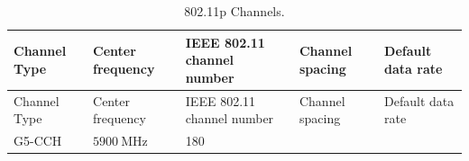 \documentclass[letterpaper,11pt]{article}
\begin{document}
\begin{onehalfspace}
\begin{longtable}[]{@{}lllll@{}}
\caption{802.11p Channels. \label{tbl:channels}}\tabularnewline
\toprule
\begin{minipage}[b]{0.08\columnwidth}\raggedright\strut
Channel Type\strut
\end{minipage} & \begin{minipage}[b]{0.30\columnwidth}\raggedright\strut
Center frequency\strut
\end{minipage} & \begin{minipage}[b]{0.16\columnwidth}\raggedright\strut
IEEE 802.11 channel number\strut
\end{minipage} & \begin{minipage}[b]{0.14\columnwidth}\raggedright\strut
Channel spacing\strut
\end{minipage} & \begin{minipage}[b]{0.18\columnwidth}\raggedright\strut
Default data rate\strut
\end{minipage}\tabularnewline
\midrule
\endfirsthead
\toprule
\begin{minipage}[b]{0.08\columnwidth}\raggedright\strut
Channel Type\strut
\end{minipage} & \begin{minipage}[b]{0.30\columnwidth}\raggedright\strut
Center frequency\strut
\end{minipage} & \begin{minipage}[b]{0.16\columnwidth}\raggedright\strut
IEEE 802.11 channel number\strut
\end{minipage} & \begin{minipage}[b]{0.14\columnwidth}\raggedright\strut
Channel spacing\strut
\end{minipage} & \begin{minipage}[b]{0.18\columnwidth}\raggedright\strut
Default data rate\strut
\end{minipage}\tabularnewline
\midrule
\endhead
\begin{minipage}[t]{0.08\columnwidth}\raggedright\strut
G5-CCH\strut
\end{minipage} & \begin{minipage}[t]{0.30\columnwidth}\raggedright\strut
\(\SI{5900}{\mega\hertz}\)\strut
\end{minipage} & \begin{minipage}[t]{0.16\columnwidth}\raggedright\strut
180\strut
\end{minipage} & \begin{minipage}[t]{0.14\columnwidth}\raggedright\strut

\end{minipage}
\end{longtable}
\end{onehalfspace}
\end{document}
